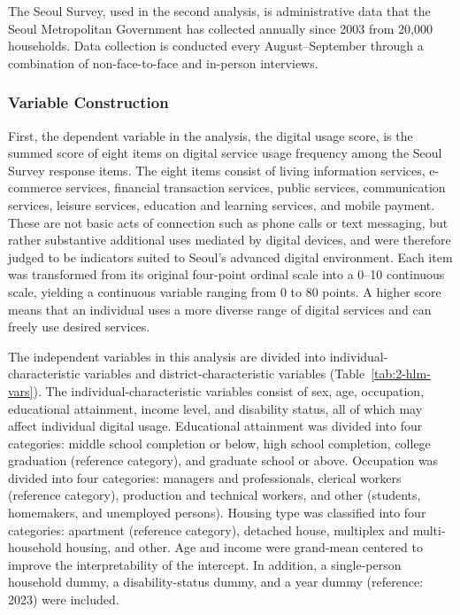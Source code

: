 The Seoul Survey, used in the second analysis, is administrative data that the Seoul Metropolitan Government has collected annually since 2003 from 20{,}000 households. Data collection is conducted every August--September through a combination of non-face-to-face and in-person interviews.

\subsubsection{Variable Construction}
\label{subsubsec:3-2-1}

First, the dependent variable in the analysis, the digital usage score, is the summed score of eight items on digital service usage frequency among the Seoul Survey response items. The eight items consist of living information services, e-commerce services, financial transaction services, public services, communication services, leisure services, education and learning services, and mobile payment. These are not basic acts of connection such as phone calls or text messaging, but rather substantive additional uses mediated by digital devices, and were therefore judged to be indicators suited to Seoul's advanced digital environment. Each item was transformed from its original four-point ordinal scale into a 0--10 continuous scale, yielding a continuous variable ranging from 0 to 80 points. A higher score means that an individual uses a more diverse range of digital services and can freely use desired services.

The independent variables in this analysis are divided into individual-characteristic variables and district-characteristic variables (Table~\ref{tab:2-hlm-vars}). The individual-characteristic variables consist of sex, age, occupation, educational attainment, income level, and disability status, all of which may affect individual digital usage. Educational attainment was divided into four categories: middle school completion or below, high school completion, college graduation (reference category), and graduate school or above. Occupation was divided into four categories: managers and professionals, clerical workers (reference category), production and technical workers, and other (students, homemakers, and unemployed persons). Housing type was classified into four categories: apartment (reference category), detached house, multiplex and multi-household housing, and other. Age and income were grand-mean centered to improve the interpretability of the intercept. In addition, a single-person household dummy, a disability-status dummy, and a year dummy (reference: 2023) were included.

